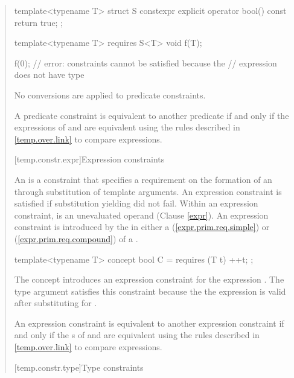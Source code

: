 \begin{quote}
\begin{codeblock}
template<typename T>
  struct S {
    constexpr explicit operator bool() const { return true; }
  };

template<typename T>
  requires S<T>{}
    void f(T);

f(0); // error: constraints cannot be satisfied because the
      // expression  does not have type 
\end{codeblock}
No conversions are applied to predicate constraints.
\exitexample

\pnum
A predicate constraint  is equivalent to another predicate
 if and only if the expressions of  and 
are equivalent using the rules described in \ref{temp.over.link} to compare
expressions.


[temp.constr.expr]{Expression constraints}

\pnum
An  is a constraint
that specifies a requirement on the formation of an
 
through substitution of template arguments.
% 
An expression constraint is satisfied if substitution 
yielding  did not fail. 
% 
Within an expression constraint,  is an unevaluated 
operand (Clause \ref{expr}).
% 
\enternote
An expression constraint is introduced by the  in 
either a  (\ref{expr.prim.req.simple})
or  (\ref{expr.prim.req.compound})
of a .
\exitnote
% 
\enterexample
\begin{codeblock}
template<typename T> concept bool C = requires (T t) { ++t; };
\end{codeblock}
The concept  introduces an expression constraint for 
the expression .
% 
The type argument  satisfies this constraint because the
the expression  is valid after substituting 
for .
\exitexample

\pnum
An expression constraint  is equivalent to another expression
constraint  if and only if the s of
 and  are equivalent using the rules described 
in \ref{temp.over.link} to compare expressions.


[temp.constr.type]{Type constraints}


\end{quote}
